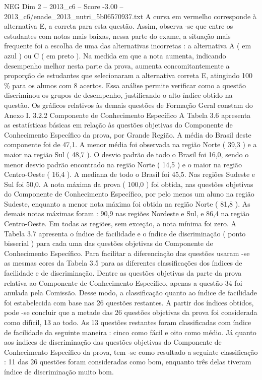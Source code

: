 \begin{textsample}{NEG Dim 2 – 2013\_c6 – Score -3.00 – 2013\_c6/enade\_2013\_nutri\_5b06570937.txt}
A curva em vermelho corresponde à alternativa E, a correta para esta questão.
Assim, observa -se que entre os estudantes com notas mais baixas, nessa parte do exame, a situação mais frequente foi a escolha de uma das alternativas incorretas : a alternativa A ( em azul ) ou C ( em preto ).
Na medida em que a nota aumenta, indicando desempenho melhor nesta parte da prova, aumenta concomitantemente a proporção de estudantes que selecionaram a alternativa correta E, atingindo 100 \% para os alunos com 8 acertos.
Essa análise permite verificar como a questão discriminou os grupos de desempenho, justificando o alto índice obtido na questão.
Os gráficos relativos às demais questões de Formação Geral constam do Anexo I. 3.2.2 Componente de Conhecimento Específico A Tabela 3.6 apresenta as estatísticas básicas em relação às questões objetivas do Componente de Conhecimento Específico da prova, por Grande Região.
A média do Brasil deste componente foi de 47,1.
A menor média foi observada na região Norte ( 39,3 ) e a maior na região Sul ( 48,7 ).
O desvio padrão de todo o Brasil foi 16,0, sendo o menor desvio padrão encontrado na região Norte ( 14,5 ) e o maior na região Centro-Oeste ( 16,4 ).
A mediana de todo o Brasil foi 45,5.
Nas regiões Sudeste e Sul foi 50,0.
A nota máxima da prova ( 100,0 ) foi obtida, nas questões objetivas do Componente de Conhecimento Específico, por pelo menos um aluno na região Sudeste, enquanto a menor nota máxima foi obtida na região Norte ( 81,8 ).
As demais notas máximas foram : 90,9 nas regiões Nordeste e Sul, e 86,4 na região Centro-Oeste.
Em todas as regiões, sem exceção, a nota mínima foi zero.
A Tabela 3.7 apresenta o índice de facilidade e o índice de discriminação ( ponto bisserial ) para cada uma das questões objetivas do Componente de Conhecimento Específico.
Para facilitar a diferenciação das questões usaram -se as mesmas cores da Tabela 3.5 para as diferentes classificações dos índices de facilidade e de discriminação.
Dentre as questões objetivas da parte da prova relativa ao Componente de Conhecimento Específico, apenas a questão 34 foi anulada pela Comissão.
Desse modo, a classificação quanto ao índice de facilidade foi estabelecida com base nas 26 questões restantes.
A partir dos índices obtidos, pode -se concluir que a metade das 26 questões objetivas da prova foi considerada como difícil, 13 ao todo.
As 13 questões restantes foram classificadas com índice de facilidade da seguinte maneira : cinco como fácil e oito como médio.
Já quanto aos índices de discriminação das questões objetivas do Componente de Conhecimento Específico da prova, tem -se como resultado a seguinte classificação : 11 das 26 questões foram consideradas como bom, enquanto três delas tiveram índice de discriminação muito bom.

\end{textsample}
